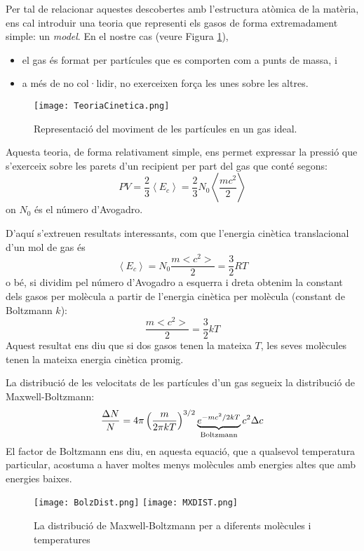 Per tal de relacionar aquestes descobertes amb l'estructura atòmica de la matèria, ens cal introduir una teoria que representi els gasos de forma extremadament simple: un \textit{model}. En el nostre cas (veure Figura \ref{fig:TeoriaCinetica}),
\begin{itemize}
\item el gas és format per partícules que es comporten com a punts de massa, i
\item a més de no col·lidir, no exerceixen força les unes sobre les altres.
\end{itemize}
\begin{figure}[h]
\centering
\texttt{[image: TeoriaCinetica.png]}
\caption{Representació del moviment de les partícules en un gas ideal.}
\label{fig:TeoriaCinetica}
\end{figure}

%

Aquesta teoria, de forma relativament simple, ens permet expressar la pressió que s'exerceix sobre les parets d'un recipient per part del gas que conté segons:
\[
PV=\frac{2}{3} \left< E_c \right> = \frac{2}{3} N_0 \left< \frac{mc^2}{2} \right>
\]
on $N_0$ és el número d'Avogadro.

D'aquí s'extreuen resultats interessants, com que l'energia cinètica translacional d'un mol de gas és 
\[\left<E_c\right>=N_0 \frac{m <c^2>}{2}=\frac{3}{2} RT\] 
o bé, si dividim pel número d'Avogadro a esquerra i dreta obtenim la constant dels gasos per molècula a partir de l'energia cinètica per molècula (constant de Boltzmann $k$): 
\[\frac{m <c^2>}{2}=\frac{3}{2} kT\]
Aquest resultat ens diu que si dos gasos tenen la mateixa $T$, les seves molècules tenen la mateixa energia cinètica promig. 


La distribució de les velocitats de les partícules d'un gas segueix la distribució de Maxwell-Boltzmann\cite{mahan_quimica_1997}:
\[
\frac{\Delta N}{N}=4 \pi \left( \frac{m}{2 \pi kT}\right)^{3/2} \underbrace{e^{-mc^2/2kT}}_{\rm Boltzmann} c^2 \Delta c
\]
El factor de Boltzmann ens diu, en aquesta equació, que a qualsevol temperatura particular, acostuma a haver moltes menys molècules amb energies altes que amb energies baixes.
\begin{figure}[h]
\centering
\texttt{[image: BolzDist.png]}
\texttt{[image: MXDIST.png]}
\caption{La distribució de Maxwell-Boltzmann per a diferents molècules i temperatures}
\label{fig:Maxwell}
\end{figure}


